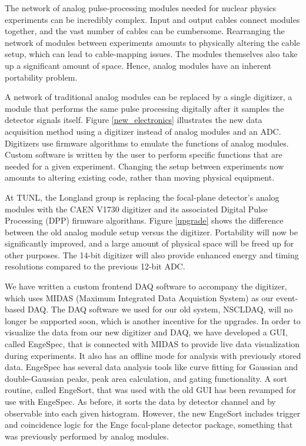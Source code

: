 The network of analog pulse-processing modules needed for nuclear physics experiments can be incredibly complex. Input and output cables connect modules together, and the vast number of cables can be cumbersome. Rearranging the network of modules between experiments amounts to physically altering the cable setup, which can lead to cable-mapping issues. The modules themselves also take up a significant amount of space. Hence, analog modules have an inherent portability problem.

A network of traditional analog modules can be replaced by a single digitizer, a module that performs the same pulse processing digitally after it samples the detector signals itself. Figure \ref{new_electronics} illustrates the new data acquisition method using a digitizer instead of analog modules and an ADC. Digitizers use firmware algorithms to emulate the functions of analog modules. Custom software is written by the user to perform specific functions that are needed for a given experiment. Changing the setup between experiments now amounts to altering existing code, rather than moving physical equipment. 

At TUNL, the Longland group is replacing the focal-plane detector's analog modules with the CAEN V1730 digitizer and its associated Digital Pulse Processing (DPP) firmware algorithms. Figure \ref{upgrade} shows the difference between the old analog module setup versus the digitizer. Portability will now be significantly improved, and a large amount of physical space will be freed up for other purposes. The 14-bit digitizer will also provide enhanced energy and timing resolutions compared to the previous 12-bit ADC.

We have written a custom frontend DAQ software to accompany the digitizer, which uses MIDAS (Maximum Integrated Data Acquistion System) as our event-based DAQ. The DAQ software we used for our old system, NSCLDAQ, will no longer be supported soon, which is another incentive for the upgrades. In order to visualize the data from our new digitizer and DAQ, we have developed a GUI, called EngeSpec, that is connected with MIDAS to provide live data visualization during experiments. It also has an offline mode for analysis with previously stored data. EngeSpec has several data analysis tools like curve fitting for Gaussian and double-Gaussian peaks, peak area calculation, and gating functionality. A sort routine, called EngeSort, that was used with the old GUI has been revamped for use with EngeSpec. As before, it sorts the data by detector channel and by observable into each given histogram. However, the new EngeSort includes trigger and coincidence logic for the Enge focal-plane detector package, something that was previously performed by analog modules.

